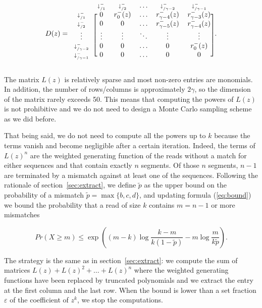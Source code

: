 \documentclass{article}
\begin{document}
\begin{equation*}
D(z) = 
\begin{blockarray}{cccccc}
   & \scriptstyle{\downarrow_{/1}^-} & \scriptstyle{\downarrow_{/2}^-} &
    \ldots & \scriptstyle{\downarrow_{/\gamma-2}^-} &
    \scriptstyle{\downarrow_{/\gamma-1}^-} \\
\begin{block}{c[ccccc]}
\scriptstyle{\downarrow_{/1}^-} & 0 & r_0^-(z) & \ldots &
    r_{\gamma-4}^-(z) & r_{\gamma-3}^-(z) \\
\scriptstyle{\downarrow_{/2}^-} & 0 & 0 & \ldots &
    r_{\gamma-5}^-(z) & r_{\gamma-4}^-(z) \\
\vdots & \vdots & \vdots & \ddots & \vdots & \vdots \\
\scriptstyle{\downarrow_{/\gamma-2}^-} & 0 & 0 & \ldots & 0 & r_0^-(z) \\
\scriptstyle{\downarrow_{/\gamma-1}^-} & 0 & 0 & \ldots & 0 & 0 \\
\end{block}
\end{blockarray}.
\end{equation*}

The matrix $L(z)$ is relatively sparse and most non-zero entries are
monomials. In addition, the number of rows/columns is approximately
$2\gamma$, so the dimension of the matrix rarely exceeds 50. This means
that computing the powers of $L(z)$ is not prohibitive and we do not need
to design a Monte Carlo sampling scheme as we did before.

That being said, we do not need to compute all the powers up to $k$
because the terms vanish and become negligible after a certain iteration.
Indeed, the terms of $L(z)^n$ are the weighted generating function of the
reads without a match for either sequences and that contain exactly $n$
segments. Of those $n$ segments, $n-1$ are terminated by a mismatch
against at least one of the sequences. Following the rationale of
section~\ref{sec:extract}, we define $\tilde{p}$ as the upper bound on the
probability of a mismatch $\tilde{p} = \max\{b,c,d\}$, and updating
formula (\ref{eq:bound}) we bound the probability that a read of size $k$
contains $m = n-1$ or more mismatches

\begin{equation*}
Pr(X \geq m) \leq \exp \left( (m-k)\log \frac{k-m}{k(1-\tilde{p})} -m\log
\frac{m}{k\tilde{p}} \right).
\end{equation*}

The strategy is the same as in section~\ref{sec:extract}: we compute the
sum of matrices $L(z) + L(z)^2 + \ldots + L(z)^n$ where the weighted
generating functions have been replaced by truncated polynomials and we
extract the entry at the first column and the last row. When the bound is
lower than a set fraction $\varepsilon$ of the coefficient of $z^k$, we
stop the computations.
\end{document}
